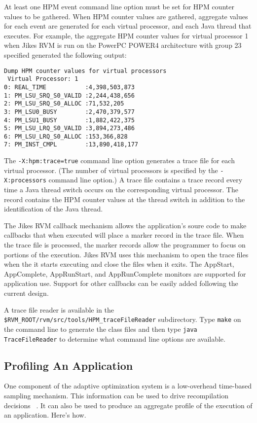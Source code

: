 At least one HPM event command line option must be set for HPM counter values to be gathered.  
When HPM counter values are gathered, aggregate values for each event 
are generated for each virtual processor, and each Java thread that executes.
For example, the aggregate HPM counter values for virtual processor 1
when Jikes RVM is run on the PowerPC POWER4 architecture with group 23 
specified generated the following output:

\begin{verbatim}
Dump HPM counter values for virtual processors
 Virtual Processor: 1
0: REAL_TIME           :4,398,503,873
1: PM_LSU_SRQ_S0_VALID :2,244,438,656
2: PM_LSU_SRQ_S0_ALLOC :71,532,205
3: PM_LSU0_BUSY        :2,470,379,577
4: PM_LSU1_BUSY        :1,882,422,375
5: PM_LSU_LRQ_S0_VALID :3,894,273,486
6: PM_LSU_LRQ_S0_ALLOC :153,366,828
7: PM_INST_CMPL        :13,890,418,177
\end{verbatim}

The {\tt -X:hpm:trace=true} command line option generates a trace file for each 
virtual processor. 
(The number of virtual processors is specified by the {\tt -X:processors} command line option.)
A trace file contains a trace record every time a Java thread switch occurs on the 
corresponding virtual processor.
The record contains the HPM counter values at the thread switch in addition to 
the identification of the Java thread.

The Jikes RVM callback mechanism allows the application's soure code 
to make callbacks that when executed will place a marker record in the trace file.
When the trace file is processed, the marker records allow the
programmer to focus on portions of the execution.
Jikes RVM uses this mechanism to open the trace files
when the it starts executing and close the files when it exits.
The AppStart, AppComplete, AppRunStart, and AppRunComplete monitors
are supported for application use.  
Support for other callbacks can be easily added following the current design.

A trace file reader is available in the {\tt \$RVM\_ROOT/rvm/src/tools/HPM\_traceFileReader}
subdirectory.  Type {\tt make} on the command line to generate the class files and then 
type {\tt java TraceFileReader} to determine what command line options are available.


\subsection{Profiling An Application}
One component of the adaptive optimization system is a low-overhead
time-based sampling mechanism.  This information can be used to drive
recompilation decisions
\T~\cite{jalapeno-adaptive-00}.
It can also be used to produce an aggregate
profile of the execution of an application.  
Here's how.

